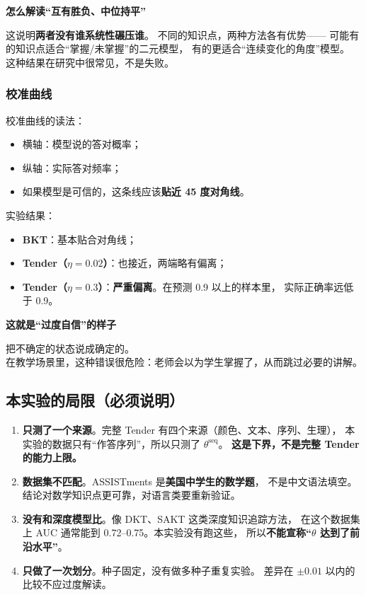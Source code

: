 \documentclass[UTF8,a4paper,11pt]{ctexart}
\newenvironment{explainbox}[1]
{\begin{center}\begin{minipage}{0.94\textwidth}\colorbox{boxbg}{\parbox{0.92\textwidth}{\textbf{#1}\par\vspace{2pt}}}}
{\end{minipage}\end{center}}
\newcommand{\hl}[1]{\textcolor{blue!70!black}{\textbf{#1}}}
\newcommand{\warn}[1]{\textcolor{red!70!black}{\textbf{#1}}}
\begin{document}
\begin{explainbox}{怎么解读“互有胜负、中位持平”}
这说明\textbf{两者没有谁系统性碾压谁}。
不同的知识点，两种方法各有优势——
可能有的知识点适合“掌握/未掌握”的二元模型，
有的更适合“连续变化的角度”模型。
这种结果在研究中很常见，不是失败。
\end{explainbox}

\subsubsection{校准曲线}

校准曲线的读法：
\begin{itemize}[leftmargin=1.6em]
\item 横轴：模型说的答对概率；
\item 纵轴：实际答对频率；
\item 如果模型是可信的，这条线应该\hl{贴近 45 度对角线}。
\end{itemize}

实验结果：
\begin{itemize}[leftmargin=1.6em]
\item \textbf{BKT}：基本贴合对角线；
\item \textbf{Tender（$\eta=0.02$）}：也接近，两端略有偏离；
\item \textbf{Tender（$\eta=0.3$）}：\warn{严重偏离}。在预测 0.9 以上的样本里，
      实际正确率远低于 0.9。
\end{itemize}

\begin{explainbox}{这就是“过度自信”的样子}
把不确定的状态说成确定的。\\
在教学场景里，这种错误很危险：老师会以为学生掌握了，从而跳过必要的讲解。
\end{explainbox}

\subsection{本实验的局限（必须说明）}

\begin{enumerate}[leftmargin=1.8em]
\item \textbf{只测了一个来源}。完整 Tender 有四个来源（颜色、文本、序列、生理），
      本实验的数据只有“作答序列”，所以只测了 $\theta^{\text{seq}}$。
      \hl{这是下界，不是完整 Tender 的能力上限。}
\item \textbf{数据集不匹配}。ASSISTments 是\textbf{美国中学生的数学题}，
      不是中文语法填空。结论对数学知识点更可靠，对语言类要重新验证。
\item \textbf{没有和深度模型比}。像 DKT、SAKT 这类深度知识追踪方法，
      在这个数据集上 AUC 通常能到 0.72–0.75。本实验没有跑这些，
      所以\warn{不能宣称“$\theta$ 达到了前沿水平”}。
\item \textbf{只做了一次划分}。种子固定，没有做多种子重复实验。
      差异在 $\pm 0.01$ 以内的比较不应过度解读。
\end{enumerate}
\end{document}
